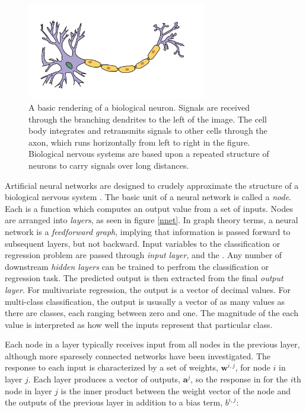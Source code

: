 \begin{figure}[t]
  \begin{center}
    \includegraphics[width=0.7\textwidth]{figures/figures/neuron.png}
  \end{center}
  \caption[A basic rendering of a biological neuron]{A basic rendering of a biological neuron.  Signals are received through the branching dendrites to the left of the image.  The cell body integrates and retransmits signals to other cells through the axon, which runs horizontally from left to right in the figure.  Biological nervous systems are based upon a repeated structure of neurons to carry signals over long distances.}

  \label{neuron}
\end{figure}

Artificial neural networks are designed to crudely approximate the structure of a biological nervous system \cite{reed1999neural}.  The basic unit of a neural network is called a \textit{node}.  Each is a function which computes an output value from a set of inputs.  Nodes are arranged into \textit{layers}, as seen in figure \ref{nnet}.  In graph theory terms, a neural network is a \textit{feedforward graph}, implying that information is passed forward to subsequent layers, but not backward.  Input variables to the classification or regression problem are passed through \textit{input layer}, and the .  Any number of downstream \textit{hidden layers} can be trained to perfrom the classification or regression task.  The predicted output is then extracted from the final \textit{output layer}.  For multivariate regression, the output is a vector of decimal values.  For multi-class classification, the output is ususally a vector of as many values as there are classes, each ranging between zero and one.  The  magnitude of the each value is interpreted as how well the inputs represent that particular class.

Each node in a layer typically receives input from all nodes in the previous layer, although more sparesely connected networks have been investigated.  The response to each input is characterized by a set of weights, $\mathbf{w}^{i,j}$, for node $i$ in layer $j$.  Each layer produces a vector of outputs, $\mathbf{a}^{j}$, so the response in for the $i$th node in layer $j$ is the inner product between the weight vector of the node and the outputs of the previous layer in addition to a bias term, $b^{i,j}$:

